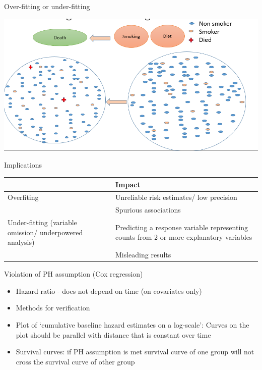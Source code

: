 \documentclass[ignorenonframetext,]{beamer}
\begin{document}
\begin{frame}{Over-fitting or under-fitting}

\includegraphics{overfit.png}

\end{frame}

\begin{frame}{Implications}

\begin{longtable}[c]{@{}ll@{}}
\toprule
& Impact\tabularnewline
\midrule
\endhead
Overfiting & Unreliable risk estimates/ low precision\tabularnewline
& Spurious associations\tabularnewline
Under-fitting (variable omission/ underpowered analysis) & Predicting a
response variable representing counts from 2 or more explanatory
variables\tabularnewline
& Misleading results\tabularnewline
\bottomrule
\end{longtable}

\end{frame}

\begin{frame}{Violation of PH assumption (Cox regression)}

\begin{itemize}
\item
  Hazard ratio - does not depend on time (on covariates only)
\item
  Methods for verification
\item
  Plot of `cumulative baseline hazard estimates on a log-scale': Curves
  on the plot should be parallel with distance that is constant over
  time
\item
  Survival curves: if PH assumption is met survival curve of one group
  will not cross the survival curve of other group
\end{itemize}

\end{frame}
\end{document}
